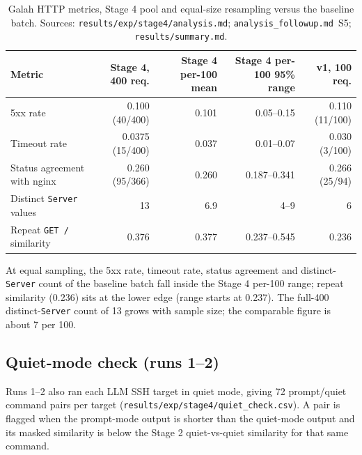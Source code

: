 \documentclass[a4paper,11pt]{article}
\begin{document}
\begin{table}[ht]
\centering
\caption{Galah HTTP metrics, Stage 4 pool and equal-size resampling versus the
baseline batch. Sources: \texttt{results/exp/stage4/analysis.md};
\texttt{analysis\_followup.md}~S5; \texttt{results/summary.md}.}
\label{tab:galah}
\scriptsize
\begin{tabularx}{\textwidth}{Y r r r r}
\toprule
Metric & Stage 4, 400 req. & Stage 4 per-100 mean & Stage 4 per-100 95\% range & v1, 100 req. \\
\midrule
5xx rate & 0.100 (40/400) & 0.101 & 0.05--0.15 & 0.110 (11/100) \\
Timeout rate & 0.0375 (15/400) & 0.037 & 0.01--0.07 & 0.030 (3/100) \\
Status agreement with nginx & 0.260 (95/366) & 0.260 & 0.187--0.341 & 0.266 (25/94) \\
Distinct \texttt{Server} values & 13 & 6.9 & 4--9 & 6 \\
Repeat \texttt{GET /} similarity & 0.376 & 0.377 & 0.237--0.545 & 0.236 \\
\bottomrule
\end{tabularx}
\end{table}

At equal sampling, the 5xx rate, timeout rate, status agreement and
distinct-\texttt{Server} count of the baseline batch fall inside the Stage 4
per-100 range; repeat similarity (0.236) sits at the lower edge (range starts
at 0.237). The full-400 distinct-\texttt{Server} count of 13 grows with sample
size; the comparable figure is about 7 per 100.

\subsection{Quiet-mode check (runs 1--2)}
\label{sec:quiet}

Runs 1--2 also ran each LLM SSH target in quiet mode, giving 72 prompt/quiet
command pairs per target (\texttt{results/exp/stage4/quiet\_check.csv}). A pair
is flagged when the prompt-mode output is shorter than the quiet-mode output
and its masked similarity is below the Stage 2 quiet-vs-quiet similarity for
that same command.
\end{document}
